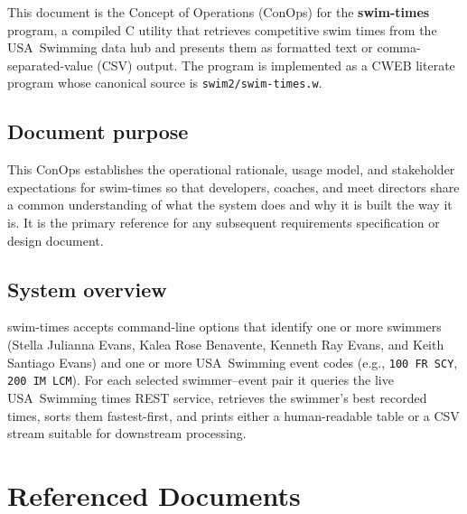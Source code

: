 \documentclass[12pt]{article}
\newcommand{\code}[1]{\texttt{#1}}
\begin{document}
This document is the Concept of Operations (ConOps) for the
\textbf{swim-times} program, a compiled C utility that retrieves
competitive swim times from the USA~Swimming data hub and presents
them as formatted text or comma-separated-value (CSV) output.
The program is implemented as a CWEB literate program whose
canonical source is \code{swim2/swim-times.w}.

\subsection{Document purpose}

This ConOps establishes the operational rationale, usage model,
and stakeholder expectations for swim-times so that developers,
coaches, and meet directors share a common understanding of what
the system does and why it is built the way it is.
It is the primary reference for any subsequent requirements
specification or design document.

\subsection{System overview}

swim-times accepts command-line options that identify one or more
swimmers (Stella Julianna Evans, Kalea Rose Benavente, Kenneth Ray
Evans, and Keith Santiago Evans) and one or more USA~Swimming event
codes (e.g., \code{100 FR SCY}, \code{200 IM LCM}).  For each
selected swimmer--event pair it queries the live USA~Swimming
times REST service, retrieves the swimmer's best recorded times, sorts
them fastest-first, and prints either a human-readable table or a
CSV stream suitable for downstream processing.

\section{Referenced Documents}
\end{document}
